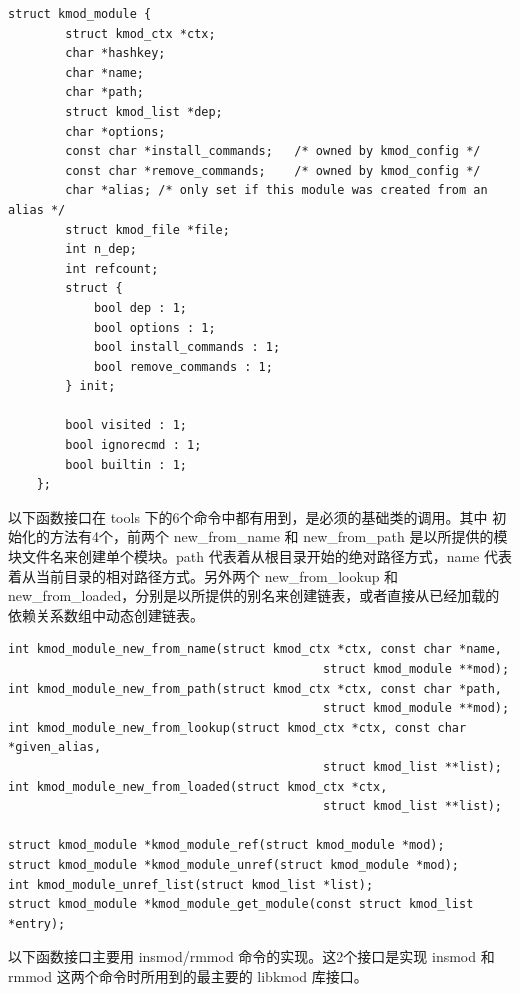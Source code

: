 {\begin{shaded}\begin{verbatim}
struct kmod_module {
        struct kmod_ctx *ctx;
        char *hashkey;
        char *name;
        char *path;
        struct kmod_list *dep;
        char *options;
        const char *install_commands;   /* owned by kmod_config */
        const char *remove_commands;    /* owned by kmod_config */
        char *alias; /* only set if this module was created from an alias */
        struct kmod_file *file;
        int n_dep;
        int refcount;
        struct {
            bool dep : 1;
            bool options : 1;
            bool install_commands : 1;
            bool remove_commands : 1;
        } init;

        bool visited : 1;
        bool ignorecmd : 1;
        bool builtin : 1;
    };
\end{verbatim}\end{shaded}}
以下函数接口在 tools 下的6个命令中都有用到，是必须的基础类的调用。其中
初始化的方法有4个，前两个 new\_from\_name 和 new\_from\_path
是以所提供的模块文件名来创建单个模块。path
代表着从根目录开始的绝对路径方式，name
代表着从当前目录的相对路径方式。另外两个 new\_from\_lookup 和
new\_from\_loaded，分别是以所提供的别名来创建链表，或者直接从已经加载的依赖关系数组中动态创建链表。

{\begin{shaded}\begin{verbatim}
int kmod_module_new_from_name(struct kmod_ctx *ctx, const char *name,
                                            struct kmod_module **mod);
int kmod_module_new_from_path(struct kmod_ctx *ctx, const char *path,
                                            struct kmod_module **mod);
int kmod_module_new_from_lookup(struct kmod_ctx *ctx, const char *given_alias,
                                            struct kmod_list **list);
int kmod_module_new_from_loaded(struct kmod_ctx *ctx,
                                            struct kmod_list **list);

struct kmod_module *kmod_module_ref(struct kmod_module *mod);
struct kmod_module *kmod_module_unref(struct kmod_module *mod);
int kmod_module_unref_list(struct kmod_list *list);
struct kmod_module *kmod_module_get_module(const struct kmod_list *entry);
\end{verbatim}\end{shaded}}
以下函数接口主要用 insmod/rmmod 命令的实现。这2个接口是实现 insmod 和
rmmod 这两个命令时所用到的最主要的 libkmod 库接口。

